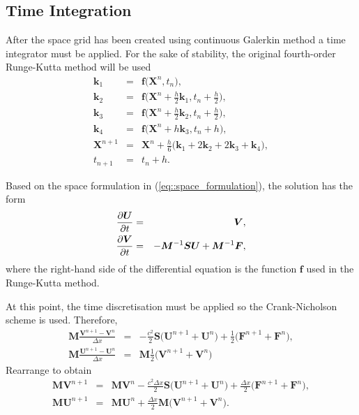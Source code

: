 \subsection{Time Integration}
After the space grid has been created using continuous Galerkin method a time integrator must be applied. For the sake of stability, the original fourth-order Runge-Kutta method will be used
\begin{eqnarray*}
  \bm{k}_1 & = & \bm{f}\big(\bm{X}^n,t_n\big), \\
  \bm{k}_2 & = & \bm{f}\bigg(\bm{X}^n + \frac{h}{2}\bm{k}_1, t_n + \frac{h}{2}\bigg), \\
  \bm{k}_3 & = & \bm{f}\bigg(\bm{X}^n + \frac{h}{2}\bm{k}_2, t_n + \frac{h}{2}\bigg), \\
  \bm{k}_4 & = & \bm{f}\big(\bm{X}^n + h\bm{k}_3, t_n + h\big), \\
  \bm{X}^{n+1} & = & \bm{X}^n + \frac{h}{6}\big(\bm{k}_1 + 2\bm{k}_2 + 2\bm{k}_3 + \bm{k}_4\big), \\
  t_{n+1} & = & t_n + h.
\end{eqnarray*}

Based on the space formulation in (\ref{eq::space_formulation}), the solution has the form
\begin{eqnarray*}
  \frac{\partial \bm{U}}{\partial t} & = & \bm{V}, \\
  \frac{\partial \bm{V}}{\partial t} & = & -\bm{M}^{-1}\bm{S}\bm{U} + \bm{M}^{-1}\bm{F},
\end{eqnarray*}
where the right-hand side of the differential equation is the function $\bm{f}$ used in the Runge-Kutta method.

At this point, the time discretisation must be applied so the Crank-Nicholson scheme is used. Therefore,
\begin{eqnarray*}
  \bm{M}\frac{\bm{V}^{n+1} - \bm{V}^n}{\Delta x} & = & - \frac{c^2}{2}\bm{S}\big(\bm{U}^{n+1} + \bm{U}^n\big) + \frac{1}{2}\big(\bm{F}^{n+1} + \bm{F}^n\big), \\
  \bm{M}\frac{\bm{U}^{n+1} - \bm{U}^n}{\Delta x} & = & \bm{M}\frac{1}{2}\big(\bm{V}^{n+1} + \bm{V}^n\big)
\end{eqnarray*}
Rearrange to obtain
\begin{eqnarray}
  \bm{M}\bm{V}^{n+1} & = & \bm{M}\bm{V}^n - \frac{c^2\Delta x}{2}\bm{S}\big(\bm{U}^{n+1} + \bm{U}^n\big) + \frac{\Delta x}{2}\big(\bm{F}^{n+1} + \bm{F}^n\big), \\
  \bm{M}\bm{U}^{n+1} & = & \bm{M}\bm{U}^n + \frac{\Delta x}{2}\bm{M}\big(\bm{V}^{n+1} + \bm{V}^n\big). \nonumber
\end{eqnarray}

